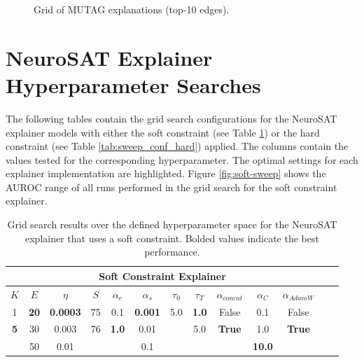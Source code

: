 \begin{figure}[htbp]
    \centering
    \caption[Grid of MUTAG explanations (top-6 edges)]{Grid of MUTAG explanations (top-10 edges).}
    \label{fig:grid-MUTAG-explanations}
\end{figure}

\clearpage
\section{NeuroSAT Explainer Hyperparameter Searches}
\label{sec:neurSAT_sweeps}

The following tables contain the grid search configurations for the NeuroSAT explainer models with either the soft constraint (see Table \ref{tab:sweep_conf_soft}) or the hard constraint (see Table \ref{tab:sweep_conf_hard}) applied. The columns contain the values tested for the corresponding hyperparameter. The optimal settings for each explainer implementation are highlighted. Figure \ref{fig:soft-sweep} shows the AUROC range of all runs performed in the grid search for the soft constraint explainer.

\begin{table}[h]
  \centering
  \small
  \begin{tabular}{|c|c|c|c|c|c|c|c|c|c|c|c|c|}
  \hline
  \multicolumn{11}{|c|}{\textbf{Soft Constraint Explainer}} \\ \hline
  $K$ & $E$ & $\eta$ & $S$ & $\alpha_e$ & $\alpha_s$ & $\tau_0$ & $\tau_T$ & $\alpha_{concat}$ & $\alpha_C$ & $\alpha_{AdamW}$ \\ \hline
  1 & \textbf{20} & \textbf{0.0003} & 75 & 0.1 & \textbf{0.001} & 5.0 & \textbf{1.0} & False & 0.1 & False\\ 
  \textbf{5} & 30 & 0.003 & 76 & \textbf{1.0} & 0.01 &  & 5.0 & \textbf{True} & 1.0 & \textbf{True}\\ 
   & 50 & 0.01 &  &  & 0.1 &  &  &  & \textbf{10.0} & \\ \hline
  \end{tabular}
  \caption[NeuroSAT soft constraint grid search]{Grid search results over the defined hyperparameter space for the NeuroSAT explainer that uses a soft constraint. Bolded values indicate the best performance.}
  \label{tab:sweep_conf_soft}
\end{table}

